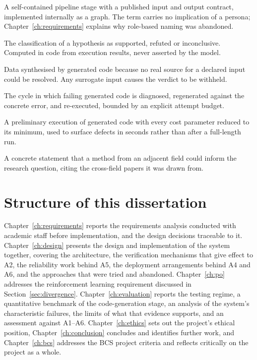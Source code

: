 \begin{description}[style=unboxed,leftmargin=0pt,itemsep=0.2em]
  \item[\emph{Agent}] A self-contained pipeline stage with a published input and output
    contract, implemented internally as a graph. The term carries no implication of a
    persona; Chapter~\ref{ch:requirements} explains why role-based naming was abandoned.
  \item[\emph{Verdict}] The classification of a hypothesis as supported, refuted or
    inconclusive. Computed in code from execution results, never asserted by the model.
  \item[\emph{Surrogate data}] Data synthesised by generated code because no real source for a
    declared input could be resolved. Any surrogate input causes the verdict to be withheld.
  \item[\emph{Fix loop}] The cycle in which failing generated code is diagnosed, regenerated
    against the concrete error, and re-executed, bounded by an explicit attempt budget.
  \item[\emph{Smoke run}] A preliminary execution of generated code with every cost parameter
    reduced to its minimum, used to surface defects in seconds rather than after a full-length
    run.
  \item[\emph{Bridge insight}] A concrete statement that a method from an adjacent field could
    inform the research question, citing the cross-field papers it was drawn from.
\end{description}

\section{Structure of this dissertation}

Chapter~\ref{ch:requirements} reports the requirements analysis conducted with academic staff
before implementation, and the design decisions traceable to it. Chapter~\ref{ch:design}
presents the design and implementation of the system together, covering the architecture, the
verification mechanisms that give effect to A2, the reliability work behind A5, the deployment
arrangements behind A4 and A6, and the approaches that were tried and abandoned.
Chapter~\ref{ch:po} addresses the reinforcement learning requirement discussed in
Section~\ref{sec:divergence}. Chapter~\ref{ch:evaluation} reports the testing regime, a
quantitative benchmark of the code-generation stage, an analysis of the system's characteristic
failures, the limits of what that evidence supports, and an assessment against A1--A6.
Chapter~\ref{ch:ethics} sets out the project's ethical position, Chapter~\ref{ch:conclusion}
concludes and identifies further work, and Chapter~\ref{ch:bcs} addresses the BCS project
criteria and reflects critically on the project as a whole.
